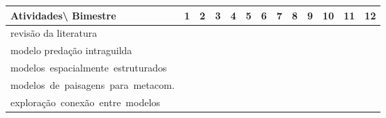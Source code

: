 \documentclass[12pt]{extarticle}
\begin{document}

\begin{table}[h!] 
\footnotesize
\noindent
\begin{tabular}{p{5.4cm}|p{0.2cm}p{0.2cm}p{0.2cm}p{0.2cm}p{0.2cm}p{0.2cm}p{0.2cm}p{0.2cm}p{0.2cm}p{0.2cm}p{0.2cm}p{0.2cm}}
    {\normalsize Atividades\textbackslash\hspace{0.1cm} Bimestre} & 1 & 2 & 3 & 4 & 5 & 6 & 7 & 8
                                                                & 9 & 10 & 11 & 12 \\ \hline 
                                              revisão da literatura& \cellcolor[gray]{0.8} & \cellcolor[gray]{0.8} &  &  &  &  &  &  &  &  &  &   \\
                                    modelo predação intraguilda &
                                          \cellcolor[gray]{0.8} &
                                          \cellcolor[gray]{0.8} &
                                          \cellcolor[gray]{0.8} &
                                          \cellcolor[gray]{0.8} &
                                          \cellcolor[gray]{0.8} & & & & & & & \\
                                    \mbox{modelos espacialmente estruturados} & & & &
                                          \cellcolor[gray]{0.8} &
                                          \cellcolor[gray]{0.8} &
                                          \cellcolor[gray]{0.8} &
                                          \cellcolor[gray]{0.8} &
                                          \cellcolor[gray]{0.8} & & & & \\
                                    \mbox{modelos de paisagens para metacom.} & & & & & & &
                                          \cellcolor[gray]{0.8} &
                                          \cellcolor[gray]{0.8} &
                                          \cellcolor[gray]{0.8} &
                                          \cellcolor[gray]{0.8} &
                                          \cellcolor[gray]{0.8} & \\
                                     \mbox{exploração conexão entre modelos} & & &
                                          \cellcolor[gray]{0.8} &
                                          \cellcolor[gray]{0.8} &
                                          \cellcolor[gray]{0.8} &
                                          \cellcolor[gray]{0.8} &

\end{tabular}
\end{table}
\end{document}
